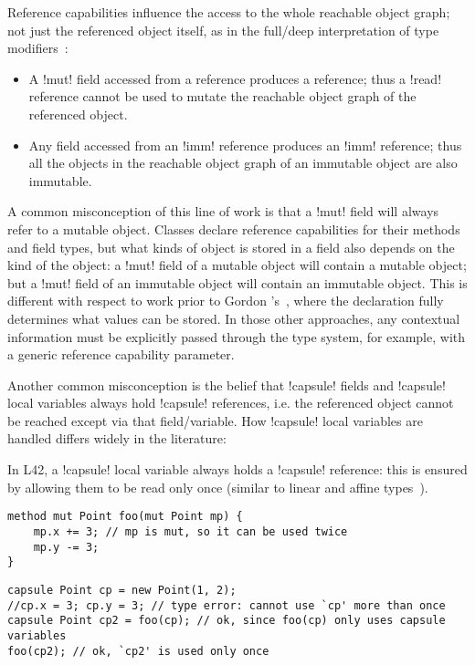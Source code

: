 Reference capabilities influence the access to the whole reachable object graph; not just the referenced object itself, as in the full/deep interpretation of type modifiers~\cite{ZibinEtAl10,Potanin2013}:
\begin{itemize}

  \item 
A \Q!mut! field accessed from a \Q@read@ reference produces a \Q@read@ reference; thus a \Q!read! reference cannot be used to mutate the reachable object graph of the referenced object.

  \item 
Any field accessed from an \Q!imm! reference produces an \Q!imm! reference; thus all the objects in the reachable object graph of an immutable object are also immutable.
\end{itemize}
A common misconception of this line of work is that a \Q!mut! field will always refer to a mutable object.
Classes declare reference capabilities for their methods and field types, but  what kinds of object is stored in a field also depends on the kind of the object: a \Q!mut! field of a mutable object will contain a mutable object; but a \Q!mut! field of an immutable object will contain an immutable object.
This is different with respect to work prior to Gordon \etal's~\cite{GordonEtAl12}, where the
declaration fully determines what values can be stored. In those other approaches, any contextual information must be explicitly passed through the type system, for example, with a generic reference capability parameter.


Another common misconception is the belief that \Q!capsule! fields and \Q!capsule! local variables always hold \Q!capsule! references, i.e. the referenced object cannot be reached except via that field/variable.
How \Q!capsule! local variables are handled differs widely in the literature:

In L42, a \Q!capsule! local variable always holds a \Q!capsule! reference: this is ensured by allowing them to be read only once (similar to linear and affine types~\cite{boyland2001alias}). \SS
\begin{lstlisting}
method mut Point foo(mut Point mp) {
	mp.x += 3; // mp is mut, so it can be used twice
	mp.y -= 3;
}
\end{lstlisting}
\begin{lstlisting}
capsule Point cp = new Point(1, 2);
//cp.x = 3; cp.y = 3; // type error: cannot use `cp' more than once
capsule Point cp2 = foo(cp); // ok, since foo(cp) only uses capsule variables
foo(cp2); // ok, `cp2' is used only once
\end{lstlisting}

